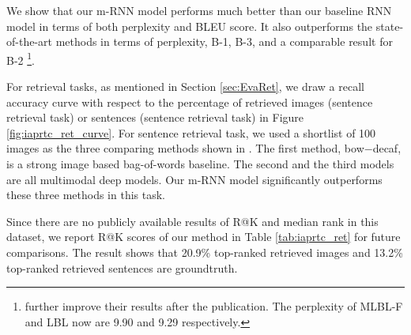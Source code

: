 We show that our m-RNN model performs much better than our baseline RNN model in terms of both perplexity and BLEU score.
It also outperforms the state-of-the-art methods in terms of perplexity, B-1, B-3, and a comparable result for B-2 \footnote{\cite{kiros2013multimodal} further improve their results after the publication. The perplexity of MLBL-F and LBL now are 9.90 and 9.29 respectively.}.

For retrieval tasks, as mentioned in Section \ref{sec:EvaRet}, we draw a recall accuracy curve with respect to the percentage of retrieved images (sentence retrieval task) or sentences (sentence retrieval task) in Figure \ref{fig:iaprtc_ret_curve}.
For sentence retrieval task, we used a shortlist of 100 images as the three comparing methods shown in \cite{kiros2013multimodal}.
The first method, bow−decaf, is a strong image based bag-of-words baseline.
The second and the third models are all multimodal deep models.
Our m-RNN model significantly outperforms these three methods in this task.

Since there are no publicly available results of R@K and median rank in this dataset, we report R@K scores of our method in Table \ref{tab:iaprtc_ret} for future comparisons.
The result shows that 20.9\% top-ranked retrieved images and 13.2\% top-ranked retrieved sentences are groundtruth.


